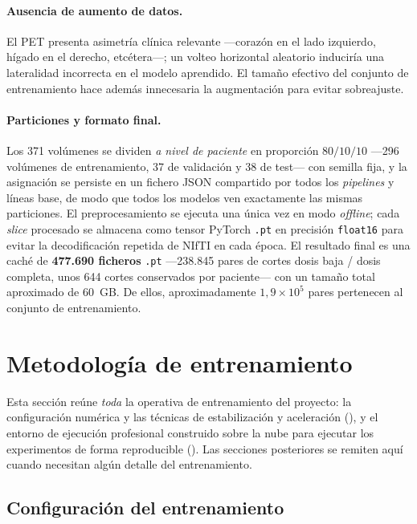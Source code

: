 \paragraph{Ausencia de aumento de datos.}
El PET presenta asimetría clínica relevante —corazón en el lado
izquierdo, hígado en el derecho, etcétera—; un volteo horizontal
aleatorio induciría una lateralidad incorrecta en el modelo
aprendido. El tamaño efectivo del conjunto de entrenamiento hace
además innecesaria la augmentación para evitar sobreajuste.

\paragraph{Particiones y formato final.}
Los 371 volúmenes se dividen \emph{a nivel de paciente} en
proporción $80 / 10 / 10$ —296 volúmenes de entrenamiento, 37 de
validación y 38 de test— con semilla fija, y la asignación se
persiste en un fichero JSON compartido por todos los
\textit{pipelines} y líneas base, de modo que todos los modelos ven
exactamente las mismas particiones. El preprocesamiento se ejecuta
una única vez en modo \textit{offline}; cada \textit{slice}
procesado se almacena como tensor PyTorch \texttt{.pt} en precisión
\texttt{float16} para evitar la decodificación repetida de NIfTI en
cada época. El resultado final es una caché de \textbf{477.690
ficheros} \texttt{.pt} —238.845 pares de cortes
dosis baja / dosis completa, unos 644 cortes conservados por
paciente— con un tamaño total aproximado de 60~GB. De ellos,
aproximadamente $1{,}9 \times 10^{5}$ pares pertenecen al conjunto
de entrenamiento.

\section{Metodología de entrenamiento}
\label{sec:pet-entrenamiento}

Esta sección reúne \emph{toda} la operativa de entrenamiento del
proyecto: la configuración numérica y las técnicas de estabilización
y aceleración (), y el entorno de ejecución
profesional construido sobre la nube para ejecutar los experimentos
de forma reproducible (). Las secciones
posteriores se remiten aquí cuando necesitan algún detalle del
entrenamiento.

\subsection{Configuración del entrenamiento}
\label{subsec:pet-config}

